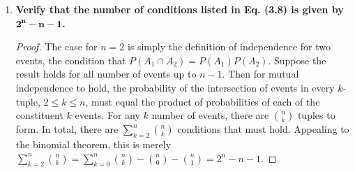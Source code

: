 \documentclass[10pt, oneside]{article}
\begin{document}
\begin{enumerate}[label=3.\arabic*]
\begin{enumerate}
	Analogously, $P [ (\neg T1 \cap T2) \cap (T1 \cup T2) ] = (1 - P(T1))P(T2)$. It follows that
	
	\begin{align*}
	P(T1 \text{ XOR } T2 | \text{def}) &= \frac{P(T1)(1 - P(T2)) + (1 - P(T1))P(T2)}{P(T1 \cup T2)} \\
	&= \frac{0.1 \cdot 0.95 + 0.9 \cdot 0.05}{0.145} = \boxed{0.966} 
	\end{align*}
	
	\textbf{Method 2.} By Bayes' Theorem,
	
	\[ P(T1 \text{ XOR } T2 | \text{def}) = \frac{P(\text{def} | T1 \cap \neg T2) P(T1 \cap \neg T2) + P(\text{def} | \neg T1 \cap T2) P(\neg T1 \cap T2)}{ P(\text{def} | T1 \cap \neg T2) P(T1 \cap \neg T2) + P(\text{def} | \neg T1 \cap T2) P(\neg T1 \cap T2) + P(\text{def} | T1 \cap T2) P(T1 \cap T2) } \]
	
	Observe that all of the probabilities of ``defective" conditional on something are all unity, for if it has a type 1 or type 2 defect (or both), it is definitionally defective. Then we can proceed as follows,
	
	\begin{align*}
	P(T1 \text{ XOR } T2 | \text{def}) &= \frac{ P(T1 \cap \neg T2) + P(\neg T1 \cap T2)}{ P(T1 \cap \neg T2) + P(\neg T1 \cap T2) + P(T1 \cap T2) } \\
	&= \frac{P(T1) (1 - P(T2)) + (1 - P(T1)) P(T2) }{P(T1) (1 - P(T2)) + (1 - P(T1)) P(T2) + P(T1) P(T2)} \\
	&= \frac{0.1 \cdot 0.95 + 0.05 \cdot 0.9}{0.1 \cdot 0.95 + 0.9 \cdot 0.05 + 0.1 \cdot 0.05} = \boxed{0.966} 
	\end{align*}
	
	\end{enumerate}

\item  \begin{tcolorbox}[
  colback=Cerulean!5!white,
  colframe=Cerulean!75!black]
\textbf{Verify that the number of conditions listed in Eq. (3.8) is given by $\bm{2^n - n - 1}$.}
\end{tcolorbox}

\begin{proof} The case for $n=2$ is simply the definition of independence for two events, the condition that $P(A_1 \cap A_2) = P(A_1) P(A_2)$. Suppose the result holds for all number of events up to $n-1$. Then for mutual independence to hold, the probability of the intersection of events in every $k$-tuple, $2 \leq k \leq n$, must equal the product of probabilities of each of the constituent $k$ events. For any $k$ number of events, there are $\binom{n}{k}$ tuples to form. In total, there are $\sum^n_{k=2} \binom{n}{k}$ conditions that must hold. Appealing to the binomial theorem, this is merely $\sum^n_{k=2} \binom{n}{k} = \sum^n_{k = 0} \binom{n}{k} - \binom{n}{0} - \binom{n}{1} = \boxed{2^n - n - 1}$. 
\end{proof}


\end{enumerate}
\end{document}
